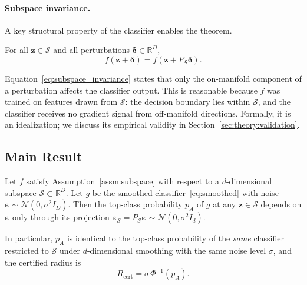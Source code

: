 \paragraph*{Subspace invariance.}
A key structural property of the classifier enables the theorem.

\begin{assumption}
\label{assm:subspace}
For all $\mathbf{z} \in \mathcal{S}$ and all perturbations
$\boldsymbol{\delta} \in \mathbb{R}^D$,
\begin{equation}
  f\!\left(\mathbf{z} + \boldsymbol{\delta}\right)
  = f\!\left(\mathbf{z} + P_\mathcal{S}\boldsymbol{\delta}\right).
  \label{eq:subspace_invariance}
\end{equation}
\end{assumption}

Equation~\eqref{eq:subspace_invariance} states that only the
on-manifold component of a perturbation affects the classifier output.
This is reasonable because $f$ was trained on features drawn from
$\mathcal{S}$: the decision boundary lies within $\mathcal{S}$, and
the classifier receives no gradient signal from off-manifold directions.
Formally, it is an idealization; we discuss its empirical validity
in Section~\ref{sec:theory:validation}.

\subsection{Main Result}
\label{sec:theory:theorem}

\begin{theorem}
\label{thm:scaling}
Let $f$ satisfy Assumption~\ref{assm:subspace} with respect to a
$d$-dimensional subspace $\mathcal{S} \subset \mathbb{R}^D$.
Let $g$ be the smoothed classifier~\eqref{eq:smoothed} with noise
$\boldsymbol{\varepsilon} \sim \mathcal{N}(0,\sigma^2 I_D)$.
Then the top-class probability $p_A$ of $g$ at any
$\mathbf{z} \in \mathcal{S}$ depends on $\boldsymbol{\varepsilon}$
only through its projection
$\boldsymbol{\varepsilon}_\mathcal{S} = P_\mathcal{S}\boldsymbol{\varepsilon}
\sim \mathcal{N}(0,\sigma^2 I_d)$.

In particular, $p_A$ is identical to the top-class probability of
the \emph{same} classifier restricted to $\mathcal{S}$ under
$d$-dimensional smoothing with the same noise level $\sigma$, and
the certified radius is
\begin{equation}
  R_\text{cert} = \sigma\,\Phi^{-1}(p_A).
  \label{eq:certified_radius_thm}
\end{equation}
\end{theorem}

